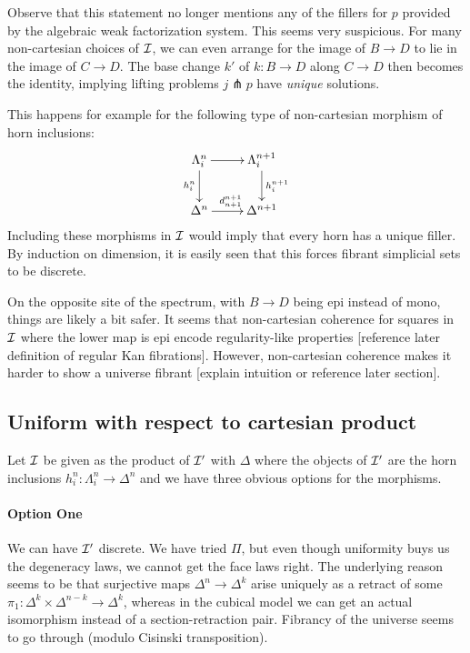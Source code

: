 \documentclass[reqno,10pt,a4paper,oneside]{amsart}
\begin{document}
Observe that this statement no longer mentions any of the fillers for $p$ provided by the algebraic weak factorization system.
This seems very suspicious.
For many non-cartesian choices of $\cal{I}$, we can even arrange for the image of $B \to D$ to lie in the image of $C \to D$.
The base change $k'$ of $k : B \to D$ along $C \to D$ then becomes the identity, implying lifting problems $j \pitchfork p$ have \emph{unique} solutions.

This happens for example for the following type of non-cartesian morphism of horn inclusions:
\[
\xymatrix{
  \Lambda_i^n
  \ar[r]
  \ar[d]_{h_i^n}
&
  \Lambda_i^{n+1}
  \ar[d]^{h_i^{n+1}}
\\
  \Delta^n
  \ar[r]^{d_{n+1}^{n+1}}
&
  \Delta^{n+1}
}
\]
Including these morphisms in $\cal{I}$ would imply that every horn has a unique filler.
By induction on dimension, it is easily seen that this forces fibrant simplicial sets to be discrete.

On the opposite site of the spectrum, with $B \to D$ being epi instead of mono, things are likely a bit safer.
It seems that non-cartesian coherence for squares in $\cal{I}$ where the lower map is epi encode regularity-like properties [reference later definition of regular Kan fibrations].
However, non-cartesian coherence makes it harder to show a universe fibrant [explain intuition or reference later section].

\subsection*{Uniform with respect to cartesian product}

Let $\cal{I}$ be given as the product of $\cal{I'}$ with $\Delta$ where the objects of $\cal{I'}$ are the horn inclusions $h_i^n : \Lambda_i^n \to \Delta^n$ and we have three obvious options for the morphisms.

\paragraph{Option One}

We can have $\cal{I'}$ discrete.
We have tried $\Pi$, but even though uniformity buys us the degeneracy laws, we cannot get the face laws right.
The underlying reason seems to be that surjective maps $\Delta^n \to \Delta^k$ arise uniquely as a retract of some $\pi_1 : \Delta^k \times \Delta^{n-k} \to \Delta^k$, whereas in the cubical model we can get an actual isomorphism instead of a section-retraction pair.
Fibrancy of the universe seems to go through (modulo Cisinski transposition).
\end{document}
